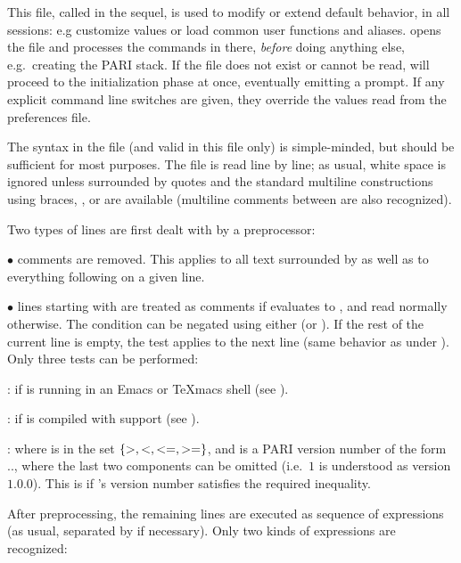 This file, called  in the sequel, is used to modify or extend
default behavior, in all  sessions: e.g customize  values or
load common user functions and aliases.  opens the  file and
processes the commands in there, \emph{before} doing anything else,
e.g.~creating the PARI stack. If the file does not exist or cannot be read,
 will proceed to the initialization phase at once, eventually emitting a
prompt. If any explicit command line switches are given, they override the
values read from the preferences file.

 The syntax in the  file (and valid in this file
only) is simple-minded, but should be sufficient for most purposes. The file
is read line by line; as usual, white space is ignored unless surrounded by
quotes and the standard multiline constructions using braces, \kbd{\bs}, or
\kbd{=} are available (multiline comments between \kbd{/*~\dots~*/} are also
recognized).

Two types of lines are first dealt with by a preprocessor:

$\bullet$ comments are removed. This applies to all text surrounded by
\kbd{/*~\dots~*/} as well as to everything following \kbd{\bs\bs} on a given
line.

$\bullet$ lines starting with   are treated as
comments if  evaluates to , and read normally
otherwise. The condition can be negated using either  (or
). If the rest of the current line is empty, the test applies to
the next line (same behavior as \kbd{=} under ). Only three tests can be
performed:

:  if  is running in an Emacs or TeXmacs shell (see
).

:  if  is compiled with  support (see
).

  : where  is in the set
$\{ {\tt >}, {\tt <}, {\tt <=}, {\tt >=} \}$, and  is a PARI
version number of the form .., where the
last two components can be omitted (i.e.~$1$ is understood as version $1.0.0$).
This is  if 's version number satisfies the required
inequality.

After preprocessing, the remaining lines are executed as
sequence of expressions (as usual, separated by \kbd{;} if necessary). Only
two kinds of expressions are recognized:

